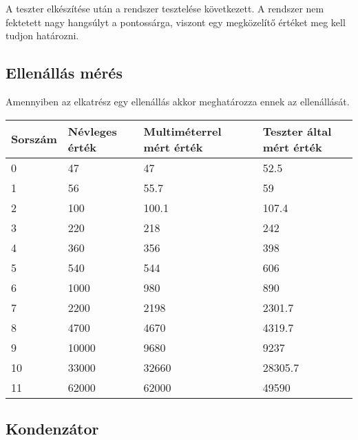 A teszter elkészítése után a rendszer tesztelése következett.
A rendszer nem fektetett nagy hangsúlyt a pontossárga, viszont egy 
megközelítő értéket meg kell tudjon határozni.

\subsection{Ellenállás mérés}

Amennyiben az elkatrész egy ellenállás akkor meghatározza ennek az ellenállását.


\begin{table}[]
    \begin{tabular}{|l|l|l|l|}
    \hline
    Sorszám & Névleges érték & Multiméterrel mért érték & Teszter által mért érték \\ \hline
    0       & 47             & 47                       & 52.5                     \\ \hline
    1       & 56             & 55.7                     & 59                       \\ \hline
    2       & 100            & 100.1                    & 107.4                    \\ \hline
    3       & 220            & 218                      & 242                      \\ \hline
    4       & 360            & 356                      & 398                      \\ \hline
    5       & 540            & 544                      & 606                      \\ \hline
    6       & 1000           & 980                      & 890                      \\ \hline
    7       & 2200           & 2198                     & 2301.7                   \\ \hline
    8       & 4700           & 4670                     & 4319.7                   \\ \hline
    9       & 10000          & 9680                     & 9237                     \\ \hline
    10      & 33000          & 32660                    & 28305.7                  \\ \hline
    11      & 62000          & 62000                    & 49590                    \\ \hline
    \end{tabular}
    \end{table}

\subsection{Kondenzátor}

